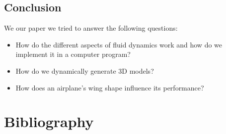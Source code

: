 \documentclass[a4paper,12pt,titlepage]{article}
\begin{document}
\subsection{Conclusion}
We our paper we tried to answer the following questions: 
\begin{itemize}
	\item{How do the different aspects of fluid dynamics work and how do we implement it in a computer program?}
	\item{How do we dynamically generate 3D models?}
	\item{How does an airplane's wing shape influence its performance?}
\end{itemize}

\section{Bibliography}
\nocite{*}
\printbibliography
\end{document}
